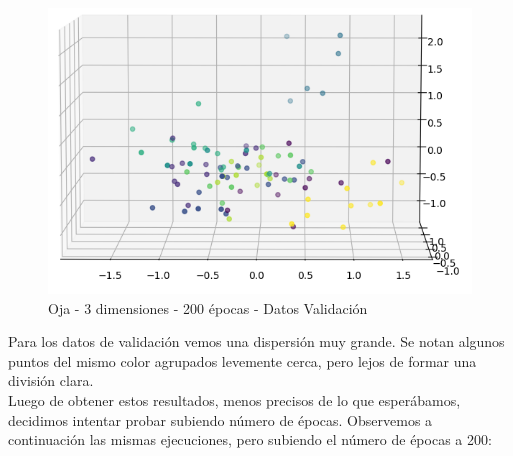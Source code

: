 \begin{figure}[h]
  \begin{center}
    \includegraphics[scale=0.65]{../img/ej1/oja/oja_3salida_100ep_validation_2.png}
  \caption{Oja - 3 dimensiones - 200 épocas - Datos Validación}
  \end{center}
\end{figure}

\newpage

Para los datos de validación vemos una dispersión muy grande. Se notan algunos puntos del mismo color agrupados levemente cerca, pero lejos
de formar una división clara.\\

Luego de obtener estos resultados, menos precisos de lo que esperábamos, decidimos intentar probar subiendo número de épocas. Observemos a continuación las mismas ejecuciones, pero subiendo el número de épocas a 200:

